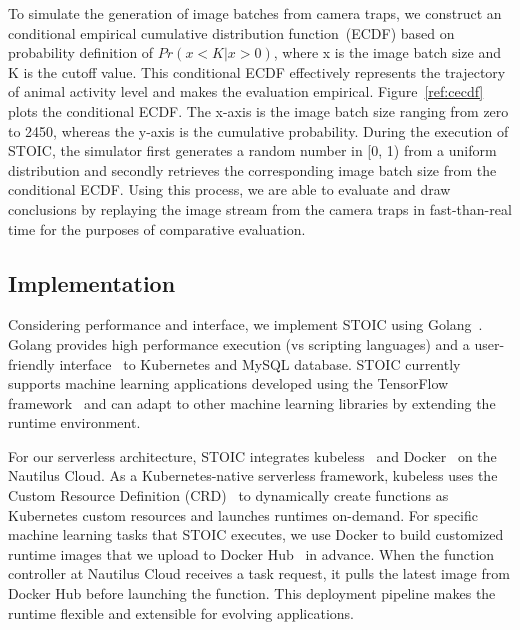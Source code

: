To simulate the generation of image batches from camera traps, we construct an
conditional empirical cumulative distribution function~(ECDF) based on
probability definition of  $Pr(x < K | x > 0)$, where x is the image batch
size and K is the cutoff value. This conditional ECDF effectively represents
the trajectory of animal activity level and makes the evaluation empirical.
Figure~\ref{ref:cecdf} plots the conditional ECDF. The x-axis is the image
batch size ranging from zero to 2450, whereas the y-axis is the cumulative
probability. During the execution of STOIC, the simulator first generates a
random number in [0, 1) from a uniform distribution and secondly retrieves the
corresponding image batch size from the conditional ECDF. Using this process,
we are able to evaluate and draw conclusions by replaying the image stream
from the camera traps in fast-than-real time for the purposes of comparative
evaluation.



 \subsection{Implementation}

Considering performance and interface, we implement STOIC using
Golang~\cite{ref:golang}. Golang provides high performance execution (vs
scripting languages) and a user-friendly interface~\cite{ref:client-go} to
Kubernetes and MySQL database. STOIC currently supports machine learning
applications developed using the TensorFlow framework~\cite{ref:tensorflow}
and can adapt to other machine learning libraries by extending the runtime
environment.
 
For our serverless architecture, STOIC integrates kubeless~\cite{ref:kubeless}
and Docker~\cite{ref:docker} on the Nautilus Cloud. As a Kubernetes-native
serverless framework, kubeless uses the Custom Resource Definition
(CRD)~\cite{ref:crd} to dynamically create functions as Kubernetes custom
resources and launches runtimes on-demand. For specific machine learning tasks
that STOIC executes, we use Docker to build customized runtime images that we
upload to Docker Hub~\cite{ref:dockerhub} in advance. When the function
controller at Nautilus Cloud receives a task request, it pulls the latest
image from Docker Hub before launching the function. This deployment pipeline
makes the runtime flexible and extensible for evolving applications. 
 
